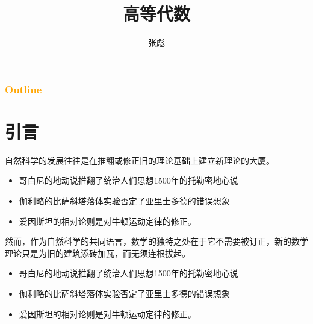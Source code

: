 \documentclass[13pt]{beamer}
\begin{document}
\title[]{高等代数}
\author[]{{\large 张彪} }

\date{}






\begin{frame}
\maketitle
\end{frame}

\begin{frame}
\frametitle{\textcolor{orange}{Outline}}
\tableofcontents
\end{frame}





\section{引言}



	

\begin{frame}
自然科学的发展往往是在推翻或修正旧的理论基础上建立新理论的大厦。
\begin{itemize}
\item 哥白尼的地动说推翻了统治人们思想1500年的托勒密地心说
\item 伽利略的比萨斜塔落体实验否定了亚里士多德的错误想象
\item 爱因斯坦的相对论则是对牛顿运动定律的修正。
\end{itemize}
\end{frame}


\begin{frame}
然而，作为自然科学的共同语言，数学的独特之处在于它不需要被订正，新的数学理论只是为旧的建筑添砖加瓦，而无须连根拔起。
	\begin{itemize}
		\item 哥白尼的地动说推翻了统治人们思想1500年的托勒密地心说
		\item 伽利略的比萨斜塔落体实验否定了亚里士多德的错误想象
		\item 爱因斯坦的相对论则是对牛顿运动定律的修正。
	\end{itemize}
\end{frame}
\end{document}
